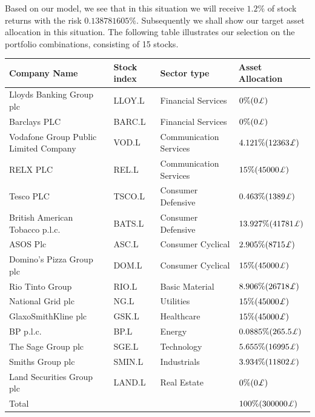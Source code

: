 Based on our model, we see that in this situation we will receive $1.2\%$ of stock returns with the risk $0.138781605\%$. Subsequently we shall show our target asset allocation in this situation. The following table illustrates our selection on the portfolio combinations, consisting of 15 stocks.

\begin{center}
\begin{tabular}{ |p{4cm}|p{1.5cm}|p{2.5cm}|p{2.5cm}|  }
\hline
Company Name& Stock index & Sector type & Asset Allocation\\
\hline
Lloyds Banking Group plc & LLOY.L & Financial Services & $0\% (0 \textit{\pounds} )$ \\
\hline
Barclays PLC & BARC.L & Financial Services & $0\% (0 \textit{\pounds} )$\\
\hline
Vodafone Group Public Limited Company & VOD.L & Communication Services & $4.121\% (12363 \textit{\pounds})$ \\
\hline
RELX PLC & REL.L & Communication Services & $15\% (45000 \textit{\pounds})$ \\
\hline
Tesco PLC & TSCO.L & Consumer Defensive & $0.463\% (1389 \textit{\pounds})$ \\
\hline
British American Tobacco p.l.c. & BATS.L & Consumer Defensive & $13.927\% (41781 \textit{\pounds})$ \\
\hline
ASOS Plc & ASC.L & Consumer Cyclical & $2.905\% (8715 \textit{\pounds})$ \\
\hline
Domino's Pizza Group plc & DOM.L & Consumer Cyclical & $15\% (45000 \textit{\pounds})$ \\
\hline
Rio Tinto Group & RIO.L & Basic Material & $8.906\% (26718 \textit{\pounds})$ \\
\hline
National Grid plc & NG.L & Utilities & $15\% (45000 \textit{\pounds})$ \\
\hline
GlaxoSmithKline plc & GSK.L & Healthcare & $15\% (45000 \textit{\pounds})$\\
\hline
BP p.l.c. & BP.L & Energy & $0.0885\% (265.5 \textit{\pounds})$ \\
\hline
The Sage Group plc & SGE.L & Technology & $5.655\% (16995 \textit{\pounds})$ \\
\hline
Smiths Group plc & SMIN.L & Industrials & $3.934\% (11802 \textit{\pounds})$ \\
\hline
Land Securities Group plc & LAND.L & Real Estate & $0\% (0 \textit{\pounds} )$ \\
\hline
Total & & & $100\% (300000 \textit{\pounds} )$\\
\hline
\end{tabular}
\end{center}

\newpage